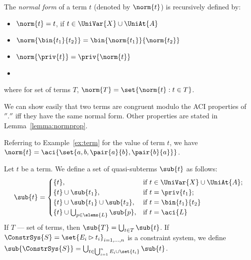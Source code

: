 \begin{df} \label{def:norm}
The \emph{normal form} of a term $t$ (denoted by $\norm{t}$) is recursively defined by:
\begin{itemize}
	\item $\norm{t}=t$, if $t\in \UniVar{X}\cup\UniAt{A}$
	\item $\norm{\bin{t_1}{t_2}} = \bin{\norm{t_1}}{\norm{t_2}} $\item $\norm{\priv{t}}=\priv{\norm{t}}$
	\item 
{}

\end{itemize}
where for set of terms $T$, $\norm{T} = \set{\norm{t}:t\in T}$.
	
\end{df}

We can show easily that two terms  are congruent modulo the ACI properties of $''.''$ iff they have the same normal form. 
Other properties are stated in Lemma~\ref{lemma:normprop}. 


\begin{example}
 Referring to Example~\ref{ex:term} for the value of term $t$, we have
$\norm{t}=\aci{\set{a,b,\pair{a}{b},\pair{b}{a}}}$.
\end{example}






\begin{df}
 Let $t$ be a term. We define a set of quasi-subterms $\sub{t}$ as follows:
\[
\sub{t} =
 \begin{cases}
 	\{t\}, & \mbox{if } t \in \UniVar{X} \cup \UniAt{A};\\
  	\{t\} \cup \sub{t_1}, & \mbox{if } t = \priv{t_1};\\
 	\{t\} \cup \sub{t_1} \cup \sub{t_2}, & \mbox{if } t = \bin{t_1}{t_2} \\\{t\} \cup \bigcup_{p\in\elems{L}}\sub{p}, & \mbox{if } t = \aci{L}\\	
 \end{cases}
\]
If $T$ --- set of terms, then $\sub{T} = \bigcup_{t \in T}{\sub{t}}$. 
If $\ConstrSys{S}=\set{E_i\rhd t_i}_{i=1,\dots, n}$ is a constraint system, we define $\sub{\ConstrSys{S}} = \bigcup_{t \in \bigcup_{i=1}^n E_i\cup\set{t_i}}{\sub{t}}$.
\end{df}


